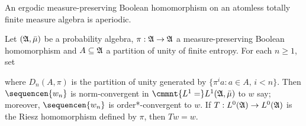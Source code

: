 An ergodic measure-preserving Boolean
homomorphism on an atomless totally finite measure algebra is aperiodic.
     
     
 Let
$(\frak A,\bar\mu)$ be a probability algebra, $\pi:\frak A\to\frak A$ a
measure-preserving Boolean homomorphism and $A\subseteq\frak A$ a
partition of unity of finite entropy.   For each $n\ge 1$, set
     
     
\noindent where $D_n(A,\pi)$ is the partition of unity generated by
$\{\pi^ia:a\in A,\,i<n\}$.   Then
$\sequencen{w_n}$ is norm-convergent in 
$\cmmnt{L^1=}L^1(\frak A,\bar\mu)$ to
$w$ say;  moreover, $\sequencen{w_n}$ is order*-convergent to
$w$.   If $T:L^0(\frak A)\to L^0(\frak A)$
is the Riesz homomorphism defined by $\pi$, then $Tw=w$.
     
